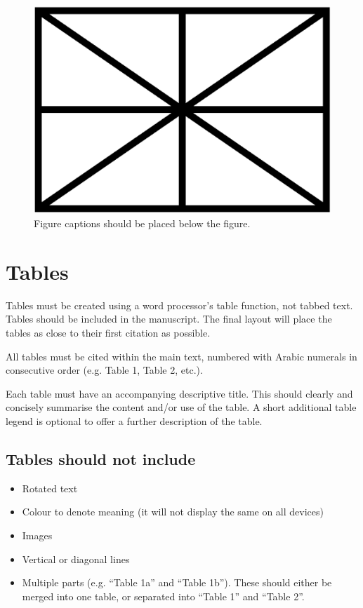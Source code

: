 \documentclass{article}
\begin{document}
\begin{figure}[htbp]
  \centering
  \includegraphics[width=0.85\columnwidth]{figure.png}
  \caption{Figure captions should be placed below the figure.}
\label{fig:figure}
\end{figure}

\section{Tables}\label{sec:tables}

Tables must be created using a word processor's table function, not tabbed text.
Tables should be included in the manuscript.
The final layout will place the tables as close to their first citation as possible.

All tables must be cited within the main text, numbered with Arabic numerals in consecutive order (e.g. Table 1, Table 2, etc.).

Each table must have an accompanying descriptive title.
This should clearly and concisely summarise the content and/or use of the table.
A short additional table legend is optional to offer a further description of the table.

\subsection{Tables should not include}

\begin{itemize}
  \item Rotated text
  \item Colour to denote meaning (it will not display the same on all devices)
  \item Images
  \item Vertical or diagonal lines
  \item Multiple parts (e.g. ``Table 1a'' and ``Table 1b'').
  These should either be merged into one table,
  or separated into ``Table 1'' and ``Table 2''.
\end{itemize}
\end{document}
